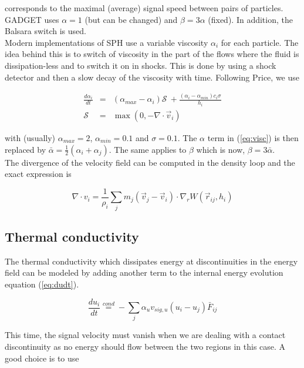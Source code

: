 \documentclass[a4paper,10pt]{article}
\begin{document}
corresponds to the maximal (average) signal speed between pairs of particles.
GADGET uses $\alpha=1$ (but can be changed) and $\beta=3\alpha$ (fixed). In addition, the Balsara switch is used. \\

Modern implementations of SPH use a variable viscosity $\alpha_i$ for each particle. The idea behind this is to switch
of viscosity in the part of the flows where the fluid is dissipation-less and to switch it on in shocks. This is done by
using a shock detector and then a slow decay of the viscosity with time. Following Price, we use

\begin{eqnarray}
 \frac{d\alpha_i}{dt} &=& \left(\alpha_{max}-\alpha_i\right)\mathcal{S}~+\frac{(\alpha_i-\alpha_{min})c_i\sigma}{h_i}\\
 \mathcal{S} &=& \max\left(0, -\nabla\cdot \vec{v}_i \right)
\end{eqnarray}

with (usually) $\alpha_{max} = 2$, $\alpha_{min} = 0.1$ and $\sigma=0.1$. The $\alpha$ term in (\ref{eq:visc}) is then
replaced by $\bar\alpha = \frac{1}{2}(\alpha_i + \alpha_j)$. The same applies to $\beta$ which is now, $\beta =
3\bar\alpha$.\\
The divergence of the velocity field can be computed in the density loop and the exact expression is

\begin{equation}
 \label{eq:div_v}
 \nabla\cdot v_i = \frac{1}{\rho_i}\sum_j m_j \left(\vec{v}_j - \vec{v}_i\right)\cdot \nabla_r W(\vec{r}_{ij},h_i) 
\end{equation}

\subsection{Thermal conductivity}

The thermal conductivity  which dissipates energy at discontinuities in the energy field can be modeled by adding
another term to the internal energy evolution equation (\ref{eq:dudt}). 

\begin{equation}
 \frac{du_i}{dt} \stackrel{cond}{=} - \sum_j \alpha_u v_{sig,u}\left(u_i - u_j\right)\bar{F}_{ij}
\end{equation}

This time, the signal velocity must vanish when we are dealing with a contact discontinuity as no energy should flow
between the two regions in this case. A good choice is to use
\end{document}
